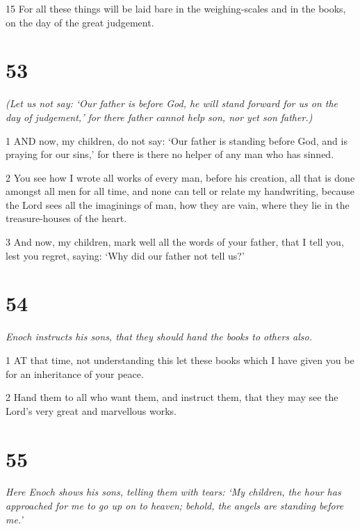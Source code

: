 \par 15 For all these things will be laid bare in the weighing-scales and in the books, on the day of the great judgement.

\chapter{53}

\par \textit{(Let us not say: ‘Our father is before God, he will stand forward for us on the day of judgement,’ for there father cannot help son, nor yet son father.)}

\par 1 AND now, my children, do not say: ‘Our father is standing before God, and is praying for our sins,’ for there is there no helper of any man who has sinned.

\par 2 You see how I wrote all works of every man, before his creation, all that is done amongst all men for all time, and none can tell or relate my handwriting, because the Lord sees all the imaginings of man, how they are vain, where they lie in the treasure-houses of the heart.

\par 3 And now, my children, mark well all the words of your father, that I tell you, lest you regret, saying: ‘Why did our father not tell us?’

\chapter{54}

\par \textit{Enoch instructs his sons, that they should hand the books to others also.}

\par 1 AT that time, not understanding this let these books which I have given you be for an inheritance of your peace.

\par 2 Hand them to all who want them, and instruct them, that they may see the Lord's very great and marvellous works.



\chapter{55}

\par \textit{Here Enoch shows his sons, telling them with tears: ‘My children, the hour has approached for me to go up on to heaven; behold, the angels are standing before me.’}

